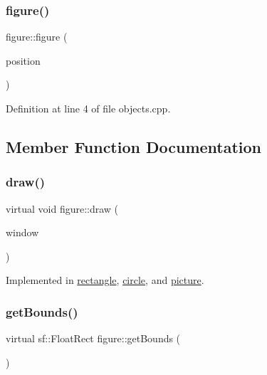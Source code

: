 \subsubsection{\texorpdfstring{figure()}{figure()}}
{\footnotesize\ttfamily figure\+::figure (\begin{DoxyParamCaption}\item[{sf\+::\+Vector2f}]{position }\end{DoxyParamCaption})}



Definition at line 4 of file objects.\+cpp.



\subsection{Member Function Documentation}
\mbox{\label{classfigure_a56d8a53a8bf2b82178aa476bac071596}} 
\subsubsection{\texorpdfstring{draw()}{draw()}}
{\footnotesize\ttfamily virtual void figure\+::draw (\begin{DoxyParamCaption}\item[{sf\+::\+Render\+Window \&}]{window }\end{DoxyParamCaption})\hspace{0.3cm}{\ttfamily [pure virtual]}}



Implemented in \hyperlink{classrectangle_aac9bb03014c071fdf932f6cfa3f34f55}{rectangle}, \hyperlink{classcircle_a49a37a81d863f524935be5953142886a}{circle}, and \hyperlink{classpicture_ac69e8047651291091abbe2a8da545aa1}{picture}.

\mbox{\label{classfigure_aca9a3924bc0883e1aa8e93c04887abbc}} 
\subsubsection{\texorpdfstring{get\+Bounds()}{getBounds()}}
{\footnotesize\ttfamily virtual sf\+::\+Float\+Rect figure\+::get\+Bounds (\begin{DoxyParamCaption}{ }\end{DoxyParamCaption})\hspace{0.3cm}{\ttfamily [pure virtual]}}



